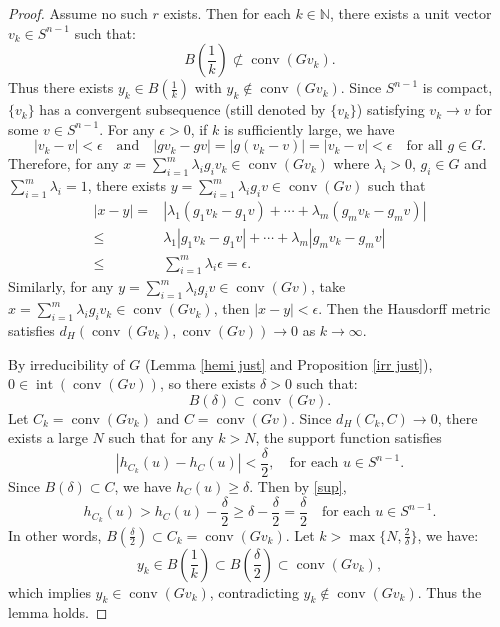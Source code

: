 \documentclass[12pt, reqno]{amsart}
\theoremstyle{definition}
\theoremstyle{remark}
\numberwithin{equation}{section}
\newcommand{\conv}{\operatorname{conv}}
\newcommand{\Sn}{S^{n-1}}
\begin{document}
	
	
	
	\begin{proof}
		Assume no such $r$ exists. Then for each $k \in \mathbb{N}$, there exists a unit vector $v_k \in S^{n-1}$ such that:
		\[
		B\left( \frac{1}{k}\right)  \not\subset \operatorname{conv}(Gv_k).
		\]
		Thus there exists $y_k \in B\left( \frac{1}{k}\right) $ with $y_k \notin \operatorname{conv}(Gv_k)$. Since $S^{n-1}$ is compact, $\{v_k\}$ has a convergent subsequence (still denoted by $\{v_k\}$) satisfying $v_k \to v$ for some $v \in S^{n-1}$.	For any $\epsilon > 0$, if $k$ is sufficiently large, we have
		\[
		|v_k - v| < \epsilon \quad \text{and} \quad |g v_k - g v|=|g(v_k - v)|=|v_k - v| < \epsilon \quad \text{for all $g\in G$}.
		\]
		Therefore, for any $x=\sum_{i=1}^{m}\lambda_{i}g_{i}v_{k}\in\conv (Gv_{k})$ where $\lambda_{i}>0$, $g_{i}\in G$ and $\sum_{i=1}^{m} \lambda_{i}=1$, there exists $y=\sum_{i=1}^{m}\lambda_{i}g_{i}v\in \conv (Gv)$ such that
		\begin{align*}
			|x-y|=&|\lambda_{1}(g_{1}v_{k}-g_{1}v)+\cdots+\lambda_{m}(g_{m}v_{k}-g_{m}v)|\\
			\le&\lambda_{1}|g_{1}v_{k}-g_{1}v|+\cdots+\lambda_{m}|g_{m}v_{k}-g_{m}v|\\
			\le&\sum_{i=1}^{m} \lambda_{i}\epsilon =\epsilon.
		\end{align*}
		Similarly, for any $y = \sum_{i=1}^{m} \lambda_i g_i v \in \operatorname{conv}(Gv)$, 
		take $x = \sum_{i=1}^{m} \lambda_i g_i v_k \in \operatorname{conv}(Gv_k)$, then $|x - y| < \epsilon$.
		Then	 the Hausdorff metric satisfies
		$d_H(\operatorname{conv}(Gv_k), \operatorname{conv}(Gv)) \to 0$ as $k \to \infty$.
		
		
		By irreducibility of $G$ (Lemma \ref{hemi just} and Proposition \ref{irr just}), $0 \in \operatorname{int}(\operatorname{conv}(Gv))$, so there exists $\delta > 0$ such that:
		\[
		B(\delta) \subset \operatorname{conv}(Gv).
		\]
		Let $C_{k}=\operatorname{conv}(Gv_k)$ and $C=\operatorname{conv}(Gv)$. Since 	$d_H(C_k, C) \to 0$, there exists a large $N$ such that for any $k>N$, the support function satisfies
		\begin{equation}\label{sup}
			\left|h_{C_{k}}(u)-h_{C}(u)\right|<\frac{\delta}{2},\quad \text{for each $u\in\Sn$}.
		\end{equation}
		Since $B(\delta) \subset C$, we have $h_{C}(u)\ge\delta$. Then
		by \eqref{sup},	
		$$h_{C_{k}}(u)>h_{C}(u)-\frac{\delta}{2}\ge \delta-\frac{\delta}{2}=\frac{\delta}{2} \quad \text{for each $u\in\Sn$}.$$
		In other words, 	$B(\frac{\delta}{2}) \subset C_{k}= \operatorname{conv}(Gv_{k})$. Let $k>\max\{N,\frac{2}{\delta}\}$, we have:
		\[
		y_{k}\in B\left( \frac{1}{k}\right)  \subset B\left( \frac{\delta}{2}\right)   \subset \operatorname{conv}(Gv_k),
		\]
		which implies $y_k \in \operatorname{conv}(Gv_k)$, contradicting $y_k \notin \operatorname{conv}(Gv_k)$. Thus the lemma holds.
	\end{proof}
	
\end{document}

